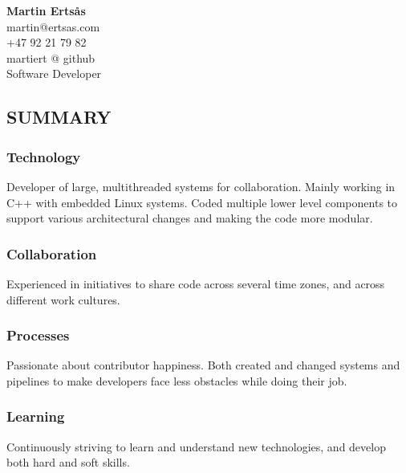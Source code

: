 \documentclass{article}
\begin{document}
\begin{center}

{\large\bf Martin Erts\aa s}\\
\bigskip
martin@ertsas.com\\
+47 92 21 79 82\\
martiert @ github\\
Software Developer\\
\end{center}

\subsection*{SUMMARY}

\begin{multicols}{2}

  \begin{addmargin}[2em]{0em}
    \subsubsection*{Technology}

    \begin{addmargin}[1em]{0em}
      Developer of large, multithreaded systems for collaboration. Mainly working in C++
      with embedded Linux systems. Coded multiple lower level components to support various
      architectural changes and making the code more modular.
    \end{addmargin}

    \subsubsection*{Collaboration}

    \begin{addmargin}[1em]{0em}
      Experienced in initiatives to share code across several time zones, and across
      different work cultures.
    \end{addmargin}

    \subsubsection*{Processes}

    \begin{addmargin}[1em]{0em}
      Passionate about contributor happiness. Both created and changed systems and pipelines
      to make developers face less obstacles while doing their job.
    \end{addmargin}

    \subsubsection*{Learning}

    \begin{addmargin}[1em]{0em}
      Continuously striving to learn and understand new technologies, and develop both hard
      and soft skills.
    \end{addmargin}

  \end{addmargin}

\end{multicols}
\end{document}
